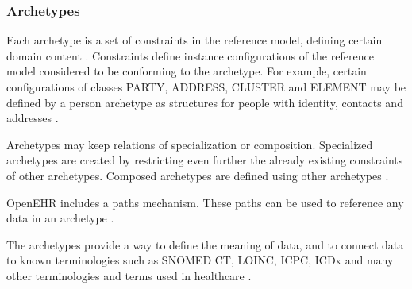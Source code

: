 \subsubsection{Archetypes}

Each archetype is a set of constraints in the reference model, defining certain domain content \cite{openEHRArchitecture}. Constraints define instance configurations of the reference model considered to be conforming to the archetype. For example, certain configurations of classes PARTY, ADDRESS, CLUSTER and ELEMENT may be defined by a person archetype as structures for people with identity, contacts and addresses \cite{openEHRAOM}.

Archetypes may keep relations of specialization or composition. Specialized archetypes are created by restricting even further the already existing constraints of other archetypes. Composed archetypes are defined using other archetypes \cite{openEHRArchitecture}.

OpenEHR includes a paths mechanism. These paths can be used to reference any data in an archetype \cite{openEHRArchitecture}.

The archetypes provide a way to define the meaning of data, and to connect data to known terminologies such as SNOMED CT, LOINC, ICPC, ICDx and many other terminologies and terms used in healthcare \cite{openEHRArchitecture}.

